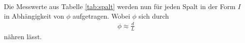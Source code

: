 %
%
%
Die Messwerte aus Tabelle \ref{tab:spalt} werden nun für jeden Spalt
in der Form $I$ in Abhängigkeit von $\phi$
aufgetragen.
Wobei $\phi$ sich durch
\begin{align*}
  \phi\approx\frac{d}{L}
\end{align*}
nähren lässt.

